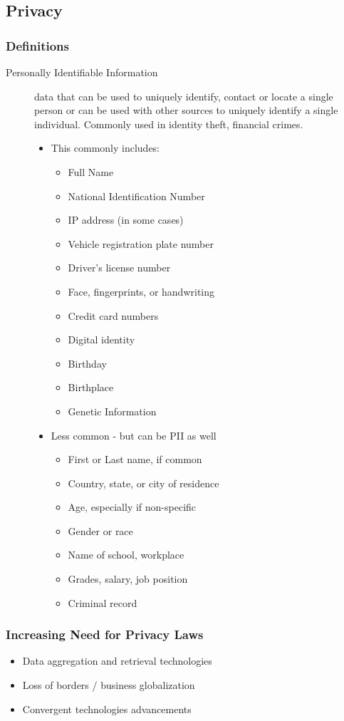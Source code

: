\documentclass[11pt]{article}
\begin{document}
\subsection{Privacy}
\label{sec:org91a46d1}
\subsubsection{Definitions}
\label{sec:orgf62de93}
\begin{description}
\item[{Personally Identifiable Information}] data that can be used to uniquely identify, contact or locate a single person or can be used with other sources to uniquely identify a single individual. Commonly used in identity theft, financial crimes.
\begin{itemize}
\item This commonly includes:
\begin{itemize}
\item Full Name
\item National Identification Number
\item IP address (in some cases)
\item Vehicle registration plate number
\item Driver's license number
\item Face, fingerprints, or handwriting
\item Credit card numbers
\item Digital identity
\item Birthday
\item Birthplace
\item Genetic Information
\end{itemize}
\item Less common - but can be PII as well
\begin{itemize}
\item First or Last name, if common
\item Country, state, or city of residence
\item Age, especially if non-specific
\item Gender or race
\item Name of school, workplace
\item Grades, salary, job position
\item Criminal record
\end{itemize}
\end{itemize}
\end{description}
\subsubsection{Increasing Need for Privacy Laws}
\label{sec:org92ff59e}
\begin{itemize}
\item Data aggregation and retrieval technologies
\item Loss of borders / business globalization
\item Convergent technologies advancements
\end{itemize}
\end{document}
